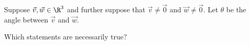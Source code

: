 \documentclass{ximera}
\author{Jim Talamo \and Jim Fowler}
\begin{document}
\begin{exercise}
  Suppose $\vec{v}, \vec{w} \in \R^3$ and further suppose that $\vec{v} \neq \vec{0}$ and $\vec{w} \neq \vec{0}$.  Let $\theta$ be the angle between $\vec{v}$ and $\vec{w}$.

  Which statements are necessarily true?
  \begin{selectAll}
  \end{selectAll}    
\end{exercise}
\end{document}
